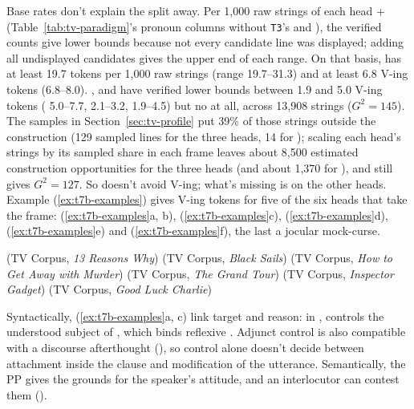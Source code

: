 \documentclass[12pt]{article}
\begin{document}
Base rates don't explain the split away. Per 1,000 raw strings of each head +  (Table~\ref{tab:tv-paradigm}'s pronoun columns without \texttt{T3}'s  and ), the verified counts give lower bounds because not every candidate line was displayed; adding all undisplayed candidates gives the upper end of each range. On that basis,  has at least 19.7  tokens per 1,000 raw strings (range 19.7--31.3) and at least 6.8  V-ing tokens (6.8--8.0). ,  and  have verified lower bounds between 1.9 and 5.0  V-ing tokens ( 5.0--7.7,  2.1--3.2,  1.9--4.5) but no  at all, across 13,908 strings ($G^2 = 145$). The samples in Section~\ref{sec:tv-profile} put 39\% of those strings outside the construction (129 sampled lines for the three heads, 14 for ); scaling each head's strings by its sampled share in each frame leaves about 8,500 estimated construction opportunities for the three heads (and about 1,370 for ), and still gives $G^2 = 127$. So  doesn't avoid  V-ing; what's missing is  on the other heads. Example (\ref{ex:t7b-examples}) gives  V-ing tokens for five of the six heads that take the frame:  (\ref{ex:t7b-examples}a, b),  (\ref{ex:t7b-examples}c),  (\ref{ex:t7b-examples}d),  (\ref{ex:t7b-examples}e) and  (\ref{ex:t7b-examples}f), the last a jocular mock-curse.

\ea\label{ex:t7b-examples}
\ea {} \hfill (TV Corpus, \emph{13 Reasons Why})
\ex {} \hfill (TV Corpus, \emph{Black Sails})
\ex {} \hfill (TV Corpus, \emph{How to Get Away with Murder})
\ex {} \hfill (TV Corpus, \emph{The Grand Tour})
\ex {} \hfill (TV Corpus, \emph{Inspector Gadget})
\ex {} \hfill (TV Corpus, \emph{Good Luck Charlie})
\z
\z

Syntactically, (\ref{ex:t7b-examples}a, c) link target and reason: in ,  controls the understood subject of , which binds reflexive . Adjunct control is also compatible with a discourse afterthought (), so control alone doesn't decide between attachment inside the clause and modification of the utterance. Semantically, the PP gives the grounds for the speaker's attitude, and an interlocutor can contest them ().
\end{document}
